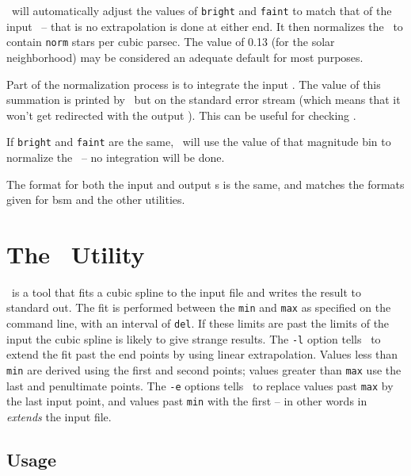 \documentclass[11pt,twoside]{article}
\begin{document}
\mknlf\ will automatically adjust the values of {\tt bright} and {\tt faint}
to match that of the input \lf\ -- that is no extrapolation is done at either
end. It then normalizes the \lf\ to contain {\tt norm} stars per cubic parsec.
The value of 0.13 (for the solar neighborhood) may be considered an adequate 
default for most purposes.

Part of the normalization process is to integrate the input \lf. The value of
this summation is printed by \mknlf\ but on the standard error stream (which
means that it won't get redirected with the output \lf). This can be useful
for checking \mknlf.

If {\tt bright} and {\tt faint} are the same, \mknlf\ will use the value
of that magnitude bin to normalize the \lf\ -- no integration will be done.

The format for both the input and output \lf s is the same, and matches the
formats given for {\sc bsm} and the other utilities.


\newpage
\section{The \mkspl\ Utility}

\mkspl\ is a tool that fits a cubic spline to the input file and writes
the result to standard out. The fit is performed between the {\tt min} and
{\tt max} as specified on the command line, with an interval of {\tt del}.
If these limits are past the limits of the input the cubic spline is likely
to give strange results. The {\tt -l} option tells \mkspl\ to extend the fit
past the end points by using linear extrapolation. Values less than {\tt min}
are derived using the first and second points; values greater than {\tt max}
use the last and penultimate points. The {\tt -e} options tells \mkspl\ to
replace values past {\tt max} by the last input point, and values past 
{\tt min} with the first -- in other words in {\em extends} the input file.

\subsection*{Usage}
\end{document}
